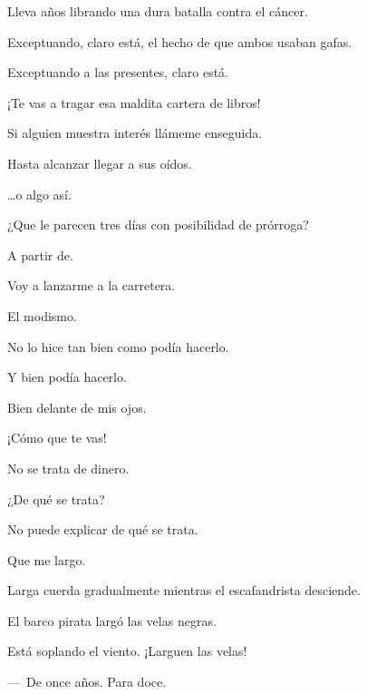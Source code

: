\sk
Lleva años librando una dura batalla contra el cáncer. 

\sk
Exceptuando, claro está, el hecho de que ambos usaban gafas. 

\sk
Exceptuando a las presentes, claro está. 

\sk
¡Te vas a tragar esa maldita cartera de libros! 

\sk
Si alguien muestra interés llámeme enseguida. 

\sk
Hasta alcanzar llegar a sus oídos. 

\sk
\ldots{}o algo así. 

\sk
¿Que le parecen tres días con posibilidad de prórroga? 

\sk
A partir de. 

\sk
Voy a lanzarme a la carretera. 

\sk
El modismo. 

\sk
No lo hice tan bien como podía hacerlo. 

\sk
Y bien podía hacerlo. 

\sk
Bien delante de mis ojos. 

\sk
¡Cómo que te vas! 

\sk
No se trata de dinero. 

\sk
¿De qué se trata? 

\sk
No puede explicar de qué se trata. \nb{}

\sk
Que me largo. 

\sk
Larga cuerda gradualmente mientras el escafandrista desciende. 

\sk
El barco pirata largó las velas negras. 

\sk
Está soplando el viento. ¡Larguen las velas! 

\sk
---~De once años. Para doce. 

